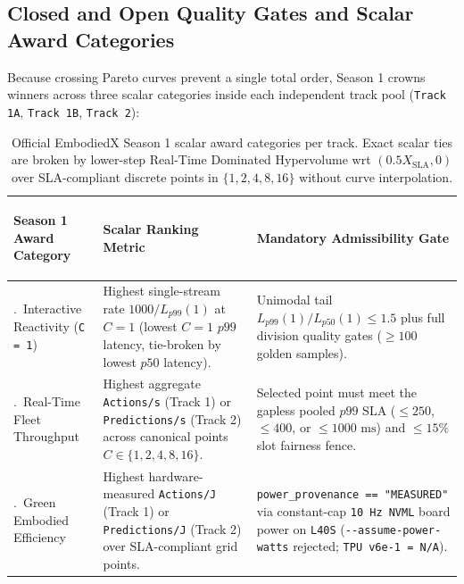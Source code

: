 \documentclass[10pt,letterpaper]{article}
\begin{document}
\subsection{Closed and Open Quality Gates and Scalar Award Categories}

Because crossing Pareto curves prevent a single total order, Season 1 crowns winners across three scalar categories inside each independent track pool (\texttt{Track 1A}, \texttt{Track 1B}, \texttt{Track 2}):

\begin{table}[ht!]
\centering
\footnotesize
\renewcommand{\arraystretch}{1.18}
\begin{tabularx}{\textwidth}{>{\bfseries\raggedright\arraybackslash}p{3.6cm} >{\raggedright\arraybackslash}p{6.2cm} >{\raggedright\arraybackslash}X}
\toprule
\textbf{Season 1 Award Category} & \textbf{Scalar Ranking Metric} & \textbf{Mandatory Admissibility Gate} \\
\midrule
1.\ Interactive Reactivity (\texttt{C = 1}) & Highest single-stream rate $1000 / L_{p99}(1)$ at $C = 1$ (lowest $C{=}1$ $p99$ latency, tie-broken by lowest $p50$ latency). & Unimodal tail $L_{p99}(1) / L_{p50}(1) \le 1.5$ plus full division quality gates ($\ge 100$ golden samples). \\
\midrule
2.\ Real-Time Fleet Throughput & Highest aggregate \texttt{Actions/s} (Track 1) or \texttt{Predictions/s} (Track 2) across canonical points $C \in \{1, 2, 4, 8, 16\}$. & Selected point must meet the gapless pooled $p99$ SLA ($\le 250$, $\le 400$, or $\le 1000\text{ ms}$) and $\le 15\%$ slot fairness fence. \\
\midrule
3.\ Green Embodied Efficiency & Highest hardware-measured \texttt{Actions/J} (Track 1) or \texttt{Predictions/J} (Track 2) over SLA-compliant grid points. & \texttt{power\_provenance == "MEASURED"} via constant-cap \texttt{10 Hz NVML} board power on \texttt{L40S} (\texttt{-{}-assume-power-watts} rejected; \texttt{TPU v6e-1 = N/A}). \\
\bottomrule
\end{tabularx}
\caption{Official EmbodiedX Season 1 scalar award categories per track. Exact scalar ties are broken by lower-step Real-Time Dominated Hypervolume wrt $(0.5 X_{\text{SLA}}, 0)$ over SLA-compliant discrete points in $\{1, 2, 4, 8, 16\}$ without curve interpolation.}
\end{table}
\end{document}
